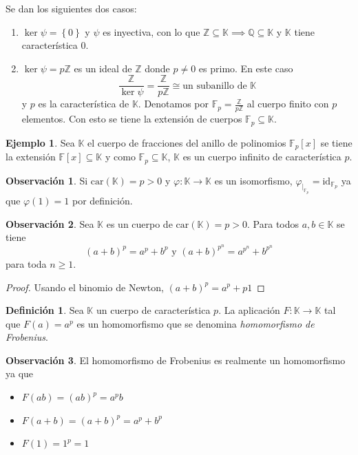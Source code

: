 \documentclass[10pt, spanish]{report}
\theoremstyle{definition}
\newtheorem*{defin}{Definición}
\newtheorem*{ej}{Ejemplo}
\newtheorem*{obs}{Observación}
\newcommand{\Z}{\mathbb{Z}}
\newcommand{\Q}{\mathbb{Q}}
\newcommand{\F}{\mathbb{F}}
\newcommand{\K}{\mathbb{K}}
\newcommand{\id}{\text{id}}
\newcommand{\car}[1]{\text{car}(#1)}
\renewcommand{\geq}{\geqslant}
\newcommand{\completar}{\fbox{\textbf{¡Completar!}}}
\begin{document}
Se dan los siguientes dos casos:
\begin{enumerate}
    \item $\ker{\psi}=\left\{ 0 \right\}$ y $\psi$ es inyectiva, con lo que
        $\Z\subseteq\K \implies \Q\subseteq\K$ y $\K$ tiene característica 0.
    \item $\ker{\psi}=p\Z$ es un ideal de $\Z$ donde $p\neq 0$ es primo. En este
        caso \[\frac{\Z}{\ker{\psi}}=\frac{\Z}{p\Z}\cong\text{un subanillo de }\K\]
        y $p$ es la característica de $\K$. Denotamos por $\F_p=\frac{\Z}{p\Z}$
        al cuerpo finito con $p$ elementos. Con esto se tiene la extensión de
        cuerpos $\F_p\subseteq\K$.
\end{enumerate}

\begin{ej}
    Sea $\K$ el cuerpo de fracciones del anillo de polinomios $\F_p[x]$ se tiene
    la extensión $\F[x]\subseteq\K$ y como $\F_p\subseteq\K$, $\K$ es un cuerpo
    infinito de característica $p$.
\end{ej}

\begin{obs}
    Si $\car{\K} = p>0$ y  $\varphi:\K\to\K$ es un isomorfismo,
    $\varphi_{\mid_{\F_p}}=\id_{\F_p}$ ya que $\varphi(1)=1$ por definición.
\end{obs}

\begin{obs}
    Sea $\K$ es un cuerpo de $\car{\K}=p>0$. Para todos $a,b\in\K$ se tiene
    \[(a+b)^p=a^p+b^p\text{ y }(a+b)^{p^n}=a^{p^n}+b^{p^n}\]
    para toda $n\geq1$.
\end{obs}

\begin{proof}
    Usando el binomio de Newton, $(a+b)^p=a^p+ {p}{1}$
    \completar
\end{proof}

\begin{defin}
    Sea $\K$ un cuerpo de característica $p$. La aplicación $F:\K\to\K$ tal
    que $F(a)=a^p$ es un homomorfismo que se denomina \textit{homomorfismo de
    Frobenius}.
\end{defin}

\begin{obs}
    El homomorfismo de Frobenius es realmente un homomorfismo ya que
    \begin{itemize}
        \item $F(ab)=(ab)^p=a^pb$
        \item $F(a+b)=(a+b)^p=a^p+b^p$
        \item $F(1)=1^p=1$
    \end{itemize}
\end{obs}
\end{document}
